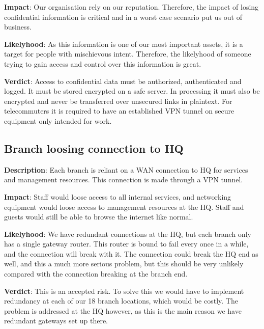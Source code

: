 \textbf{Impact}: Our organisation rely on our reputation. Therefore, the impact of losing confidential information is critical and in a worst case scenario put us out of business.

\textbf{Likelyhood}: As this information is one of our most important assets, it is a target for people with mischievous intent. Therefore, the likelyhood of someone trying to gain access and control over this information is great.

\textbf{Verdict}: Access to confidential data must be authorized, authenticated and logged. It must be stored encrypted on a safe server. In processing it must also be encrypted and never be transferred over unsecured links in plaintext. For telecommuters it is required to have an established VPN tunnel on secure equipment only intended for work.

%

\subsection{Branch loosing connection to HQ}

\textbf{Description}: Each branch is reliant on a WAN connection to HQ for services and management resources. This connection is made through a VPN tunnel.

\textbf{Impact}: Staff would loose access to all internal services, and networking equipment would loose access to management resources at the HQ. Staff and guests would still be able to browse the internet like normal.

\textbf{Likelyhood}: We have redundant connections at the HQ, but each branch only has a single gateway router. This router is bound to fail every once in a while, and the connection will break with it. The connection could break the HQ end as well, and this a much more serious problem, but this should be very unlikely compared with the connection breaking at the branch end.

\textbf{Verdict}: This is an accepted risk. To solve this we would have to implement redundancy at each of our 18 branch locations, which would be costly. The problem is addressed at the HQ however, as this is the main reason we have redundant gateways set up there.


